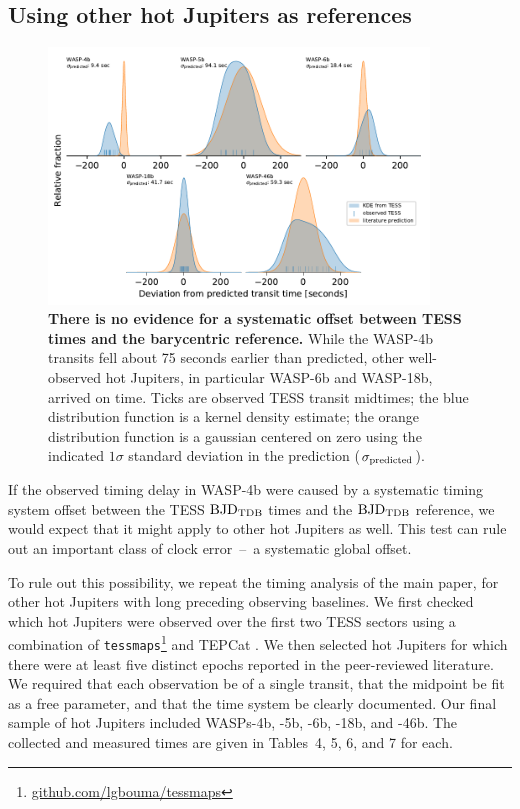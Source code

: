 \documentclass[12pt,twocolumn,tighten]{aastex62}
\begin{document}
\subsection{Using other hot Jupiters as references}
\label{sec:hj_verification}

\begin{figure}[ht!]
  \begin{center}
    \leavevmode
    \includegraphics[width=0.9\textwidth]{f6.pdf}
  \end{center}
  \vspace{-0.5cm}
  \caption{
    {\bf There is no evidence for a systematic offset between TESS
    times and the barycentric reference.}
    While the WASP-4b transits fell about 75 seconds earlier than
    predicted, other well-observed hot Jupiters, in particular WASP-6b
    and WASP-18b, arrived on time.  Ticks are observed TESS transit
    midtimes; the blue distribution function is a kernel density
    estimate; the orange distribution function is a gaussian centered
    on zero using the indicated $1\sigma$ standard deviation in the
    prediction
    ($\sigma_{\rm predicted}$).
    \label{fig:hjs}
  }
\end{figure}

If the observed timing delay in WASP-4b were caused by a systematic
timing system offset between the TESS ${\rm BJD}_{\rm TDB}$ times and
the ${\rm BJD}_{\rm TDB}$ reference, we would expect that it might
apply to other hot Jupiters as well.  This test can rule out an
important class of clock error~--~a systematic global offset.

To rule out this possibility, we repeat the timing analysis of the
main paper, for other hot Jupiters with long preceding observing
baselines.  We first checked which hot Jupiters were observed over the
first two TESS sectors using a combination of
\texttt{tessmaps}\footnote{\url{github.com/lgbouma/tessmaps}} and
TEPCat \citep{southworth_homogeneous_2011}.  We then selected hot
Jupiters for which there were at least five distinct epochs reported
in the peer-reviewed literature.  We required that each observation be
of a single transit, that the midpoint be fit as a free parameter, and
that the time system be clearly documented.  Our final sample of
hot Jupiters included WASPs-4b, -5b, -6b, -18b, and -46b.  The
collected and measured times are given in Tables~4, 5, 6, and 7
for each.
\end{document}
